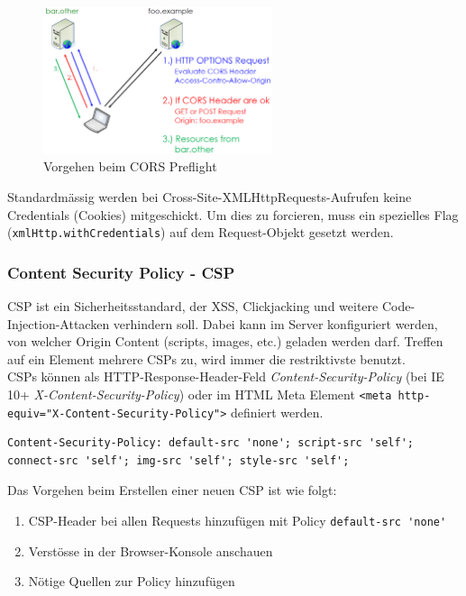 \begin{figure}[H]
	\centering
	\includegraphics[width=0.6\textwidth]{./img/cors-preflight}
	\caption{Vorgehen beim CORS Preflight}
\end{figure}

Standardmässig werden bei Cross-Site-XMLHttpRequests-Aufrufen keine Credentials (Cookies) mitgeschickt. Um dies zu forcieren, muss ein spezielles Flag (\lstinline|xmlHttp.withCredentials|) auf dem Request-Objekt gesetzt werden.

\subsubsection{Content Security Policy - CSP}
CSP ist ein Sicherheitsstandard, der XSS, Clickjacking und weitere Code-Injection-Attacken verhindern soll. Dabei kann im Server konfiguriert werden, von welcher Origin Content (scripts, images, etc.) geladen werden darf. Treffen auf ein Element mehrere CSPs zu, wird immer die restriktivste benutzt.\\
CSPs können als HTTP-Response-Header-Feld \textit{Content-Security-Policy} (bei IE 10+ \textit{X-Content-Security-Policy}) oder im HTML Meta Element \lstinline|<meta http-equiv="X-Content-Security-Policy">| definiert werden.

\begin{lstlisting}[caption=Starter Policy für CSP-Header, language={}]
Content-Security-Policy: default-src 'none'; script-src 'self'; connect-src 'self'; img-src 'self'; style-src 'self';
\end{lstlisting}

Das Vorgehen beim Erstellen einer neuen CSP ist wie folgt:
\begin{enumerate}
	\item CSP-Header bei allen Requests hinzufügen mit Policy \lstinline[language=clean]|default-src 'none'|
	\item Verstösse in der Browser-Konsole anschauen
	\item Nötige Quellen zur Policy hinzufügen
\end{enumerate}

